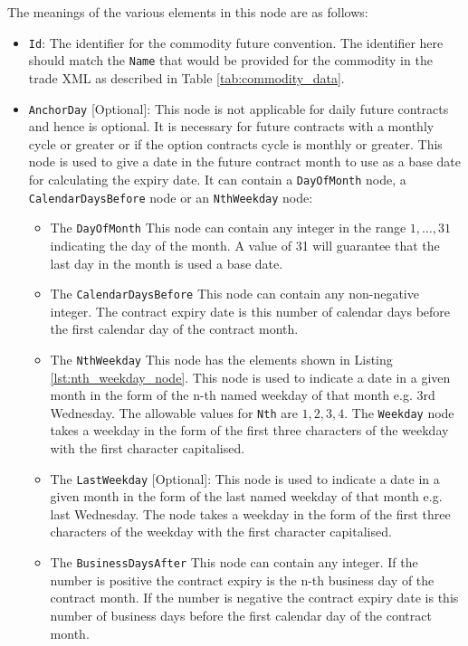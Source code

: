 The meanings of the various elements in this node are as follows:
\begin{itemize}
\item \lstinline!Id!: The identifier for the commodity future convention. The identifier here should match the \lstinline!Name! that would be provided for the commodity in the trade XML as described in Table \ref{tab:commodity_data}.
\item \lstinline!AnchorDay! [Optional]: This node is not applicable for daily future contracts and hence is optional. It is necessary for future contracts with a monthly cycle or greater or if the option contracts cycle is monthly or greater.  This node is used to give a date in the future contract month to use as a base date for calculating the expiry date. It can contain a \lstinline!DayOfMonth! node, a \lstinline!CalendarDaysBefore! node or an \lstinline!NthWeekday! node:
    \begin{itemize}
    \item The \lstinline!DayOfMonth! This node can contain any integer in the range $1,\ldots,31$ indicating the day of the month. A value of 31 will guarantee that the last day in the month is used a base date.
    \item The \lstinline!CalendarDaysBefore! This node can contain any non-negative integer. The contract expiry date is this number of calendar days before the first calendar day of the contract month.
    \item The \lstinline!NthWeekday! This node has the elements shown in Listing \ref{lst:nth_weekday_node}. This node is used to indicate a date in a given month in the form of the n-th named weekday of that month e.g. 3rd Wednesday. The allowable values for \lstinline!Nth! are ${1,2,3,4}$. The \lstinline!Weekday! node takes a weekday in the form of the first three characters of the weekday with the first character capitalised.
    \item The \lstinline!LastWeekday! [Optional]: This node is used to indicate a date in a given month in the form of the last named weekday of that month e.g. last Wednesday. The node takes a weekday in the form of the first three characters of the weekday with the first character capitalised.
    \item The \lstinline!BusinessDaysAfter! This node can contain any integer. If the number is positive the contract expiry is the n-th business day of the contract month. If the number is negative the contract expiry date is this number of business days before the first calendar day of the contract month.

\end{itemize}
\end{itemize}

